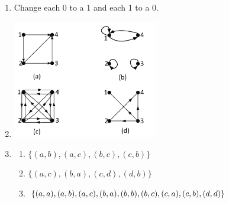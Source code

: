 \documentclass{sig-alternate-05-2015}
\begin{document}
\begin{enumerate}
\item Change each 0
to a 1 and each 1 to a 0.

\item
	\includegraphics[width=0.5\textwidth]{figs/122.pdf}
	
\item
\begin{enumerate}
	\item $\{(a, b), (a, c), (b, c), (c, b)\}$
	\item $\{(a, c), (b, a), (c, d), (d, b)\}$
	\item $\{(a, a), (a, b), (a, c), (b, a), (b, b),\\ (b, c), (c, a),
		(c, b), (d, d)\}$
\end{enumerate}

\end{enumerate}
\end{document}

